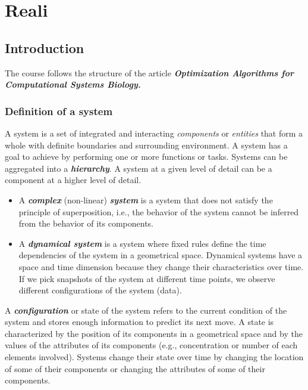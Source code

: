 \graphicspath{{chapters/07/images/}}
\chapter{Reali}


\section{Introduction}

The course follows the structure of the article
\textbf{\emph{Optimization Algorithms for Computational Systems
Biology.}}


\subsection{Definition of a system}

A system is a set of integrated and interacting \emph{components} or
\emph{entities} that form a whole with definite boundaries and
surrounding environment. A system has a goal to achieve by performing
one or more functions or tasks. Systems can be aggregated into a
\textbf{\emph{hierarchy}}. A system at a given level of detail can be a
component at a higher level of detail.

\begin{itemize}
\tightlist
\item
  A \textbf{\emph{complex}} (non-linear) \textbf{\emph{system}} is a
  system that does not satisfy the principle of superposition, i.e., the
  behavior of the system cannot be inferred from the behavior of its
  components.
\item
  A \textbf{\emph{dynamical system}} is a system where fixed rules
  define the time dependencies of the system in a geometrical space.
  Dynamical systems have a space and time dimension because they change
  their characteristics over time. If we pick snapshots of the system at
  different time points, we observe different configurations of the
  system (data).
\end{itemize}
\noindent
A \textbf{\emph{configuration}} or state of the system refers to the
current condition of the system and stores enough information to predict
its next move. A state is characterized by the position of its
components in a geometrical space and by the values of the attributes of
its components (e.g., concentration or number of each elements
involved). Systems change their state over time by changing the location
of some of their components or changing the attributes of some of their
components.

